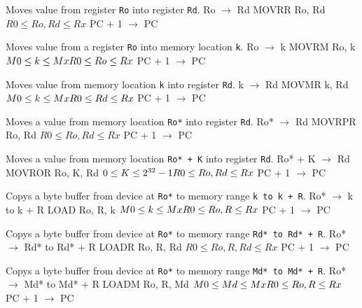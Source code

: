 \documentclass[titlepage]{scrartcl}
\begin{document}
{Moves value from register \texttt{Ro} into register \texttt{Rd}.}
{Ro $\rightarrow$ Rd}
{MOVRR Ro, Rd}
{$R0 \leq Ro, Rd \leq Rx$}
{PC + 1 $\rightarrow$ PC}
{}
{\srtable{}{}{}{}}

{Moves value from a register \texttt{Ro} into memory location \texttt{k}.}
{Ro $\rightarrow$ k}
{MOVRM Ro, k}
{$M0 \leq k \leq Mx \hfill \break R0 \leq Ro \leq Rx$}
{PC + 1 $\rightarrow$ PC}
{}
{\srtable{}{}{}{}}

{Moves value from memory location \texttt{k} into register \texttt{Rd}.}
{k $\rightarrow$ Rd}
{MOVMR k, Rd}
{$M0 \leq k \leq Mx \hfill \break R0 \leq Rd \leq Rx$}
{PC + 1 $\rightarrow$ PC}
{}
{\srtable{}{}{}{}}

{Moves a value from memory location \texttt{Ro*} into register \texttt{Rd}.}
{Ro* $\rightarrow$ Rd}
{MOVRPR Ro, Rd}
{$R0 \leq Ro, Rd \leq Rx$}
{PC + 1 $\rightarrow$ PC}
{}
{\srtable{}{}{}{}}

{Moves a value from memory location \texttt{Ro* + K} into register \texttt{Rd}.}
{Ro* + K $\rightarrow$ Rd}
{MOVROR Ro, K, Rd}
{$0 \leq K \leq 2^{32} - 1 \hfill \break R0 \leq Ro, Rd \leq Rx$}
{PC + 1 $\rightarrow$ PC}
{}
{\srtable{}{}{}{}}

{Copys a byte buffer from device at \texttt{Ro*} to memory range \texttt{k to k + R}.}
{Ro* $\rightarrow$ k to k + R}
{LOAD Ro, R, k}
{$M0 \leq k \leq Mx \hfill \break R0 \leq Ro, R \leq Rx$}
{PC + 1 $\rightarrow$ PC}
{}
{\srtable{}{}{}{}}

{Copys a byte buffer from device at \texttt{Ro*} to memory range \texttt{Rd* to Rd* + R}.}
{Ro* $\rightarrow$ Rd* to Rd* + R}
{LOADR Ro, R, Rd}
{$R0 \leq Ro, R, Rd \leq Rx$}
{PC + 1 $\rightarrow$ PC}
{}
{\srtable{}{}{}{}}

{Copys a byte buffer from device at \texttt{Ro*} to memory range \texttt{Md* to Md* + R}.}
{Ro* $\rightarrow$ Md* to Md* + R}
{LOADM Ro, R, Md}
{$M0 \leq Md \leq Mx \hfill \break R0 \leq Ro, R \leq Rx$}
{PC + 1 $\rightarrow$ PC}
{}
{\srtable{}{}{}{}}
\end{document}
